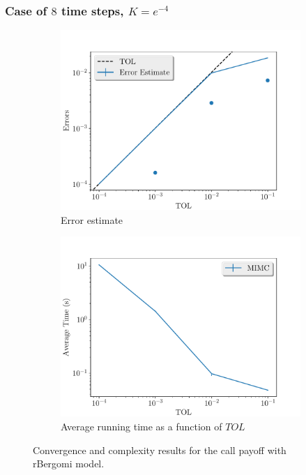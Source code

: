 \documentclass[11pt]{article}
\begin{document}
\newpage
\subsubsection*{Case of $8$ time steps, $K=e^{-4}$}
\begin{figure}[!h]
	\centering
	\begin{subfigure}{.5\textwidth}
		\centering
		\includegraphics[width=1\linewidth]{./figures/rbergomi_8_steps_K_e__4/error_estimate.pdf}
		\caption{Error estimate}
		\label{fig:misc_rbergomi_8_steps_sub1}
	\end{subfigure}%
	\begin{subfigure}{.5\textwidth}
		\centering
		\includegraphics[width=1\linewidth]{./figures/rbergomi_8_steps_K_e__4/average_running_time.pdf}
		\caption{Average running time as a function of $TOL$}
		\label{fig:misc_rbergomi_8_steps_sub2}
	\end{subfigure}%
	\caption{Convergence and complexity results for the call payoff with rBergomi model.}
	\label{fig:misc_rbergomi_8_steps_1}
\end{figure}
\end{document}
